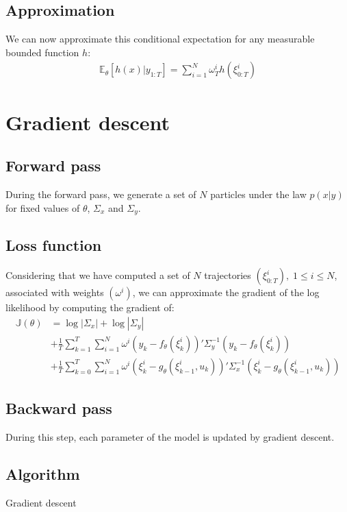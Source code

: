 \documentclass[10pt,a4paper]{report}
\begin{document}
\subsection{Approximation}
We can now approximate this conditional expectation for any measurable bounded function $h$:
\begin{align*}
        \mathbb{E}_\theta \left[ h(x) | y_{1:T} \right] = \sum_{i=1}^N \omega_T^i h(\xi_{0:T}^i)
\end{align*}

\section{Gradient descent}
\label{sec:gradient_descent}

\subsection{Forward pass}
During the forward pass, we generate a set of $N$ particles under the law $p(x|y)$ for fixed values of $\theta$, $\Sigma_x$ and $\Sigma_y$.

\subsection{Loss function}
Considering that we have computed a set of $N$ trajectories $(\xi^i_{0:T}),\;1 \leq i \leq N$, associated with weights $(\omega^i)$, we can approximate the gradient of the log likelihood by computing the gradient of:
\begin{align*}
        \mathbb{J}(\theta) & = \log |\Sigma_x| + \log |\Sigma_y|                                                                                                        \\
                           & + \frac{1}{T}\sum_{k=1}^T \sum_{i=1}^N \omega^i (y_k - f_\theta(\xi_k^i))' \Sigma_y^{-1} (y_k - f_\theta(\xi_k^i))                         \\
                           & + \frac{1}{T}\sum_{k=0}^T \sum_{i=1}^N \omega^i (\xi_k^i - g_\theta(\xi_{k-1}^i, u_k))'\Sigma_x^{-1}(\xi_k^i - g_\theta(\xi_{k-1}^i, u_k))
\end{align*}

\subsection{Backward pass}
During this step, each parameter of the model is updated by gradient descent.

\subsection{Algorithm}
\begin{algorithm}
    \caption{Gradient descent}
\end{algorithm}
\end{document}
